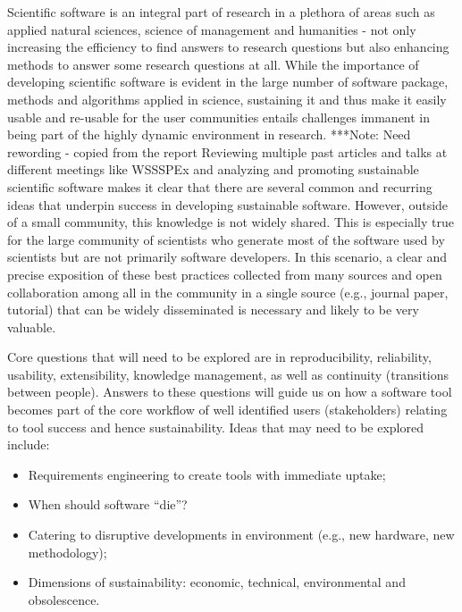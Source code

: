 \documentclass[11pt, oneside]{amsart}
\newcommand{\note}[1]{ {\textcolor{blueish}    { ***Note:      #1 }}}
\begin{document}
Scientific software is an integral part of research in a plethora of areas such as applied natural sciences, science of management and humanities - not only increasing the efficiency to find answers to research questions but also enhancing methods to answer some research questions at all. While the importance of developing scientific software is evident in the large number of software package, methods and algorithms applied in science, sustaining it and thus make it easily usable and re-usable for the user communities entails challenges immanent in being part of the highly dynamic environment in research. 
\note{Need rewording - copied from the report}
Reviewing multiple past articles and talks at different meetings like WSSSPEx
\cite{WSSSPE1, WSSSPE2, 5069157, Blatt_WSSSPE, Ahern_WSSSPE} and analyzing and
promoting sustainable scientific software makes it clear that there are several
common and recurring ideas that underpin success in developing sustainable
software. However, outside of a small community, this knowledge is not widely
shared. This is especially true for the large community of scientists who
generate most of the software used by scientists but are not primarily software
developers. In this scenario, a clear and precise exposition of these best
practices collected from many sources and open collaboration among all in the
community in a single source (e.g., journal paper, tutorial) that can be widely
disseminated is necessary and likely to be very valuable.

Core questions that will need to be explored are in reproducibility, 
reliability,  usability, extensibility, knowledge management, as well as continuity
(transitions between people). Answers to these questions will guide us on how a software
tool becomes part of the core workflow of well identified users (stakeholders)
relating to tool success and hence sustainability.
Ideas  that may need to be explored include:
\begin{itemize}
\item Requirements engineering to create tools with immediate uptake;
\item When should software ``die''?
\item Catering to disruptive developments in environment (e.g., new hardware,
new methodology);
\item Dimensions of sustainability: economic, technical, environmental and
obsolescence. 
\end{itemize}
\end{document}
